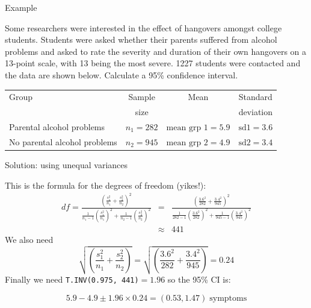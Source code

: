 \documentclass[12pt,xcolor=dvipsnames,handout,mathserif,aspectratio=169]{beamer}
\begin{document}
\begin{frame}{Example}

\begin{block}{}
Some researchers were interested in the effect of hangovers amongst college students. Students were asked whether their parents suffered from alcohol problems and asked to rate the severity and duration of their own hangovers on a 13-point scale, with 13 being the most severe. 1227 students were contacted and the data are shown below. Calculate a 95\% confidence interval.
\begin{center}
\begin{tabular}{lccc}
\hline
Group & Sample & Mean & Standard \\
& size & & deviation \\
\hline
Parental alcohol problems & $n_1=282$ & $\mbox{mean grp 1}=5.9$ & $\mbox{sd1}=3.6$\\ 
No parental alcohol problems & $n_2=945$ & $\mbox{mean grp 2}=4.9$ & $\mbox{sd2}=3.4$\\
\hline
\end{tabular}
\end{center}
\end{block}
\end{frame}

\begin{frame}{Solution: using unequal variances}

This is the formula for the degrees of freedom (yikes!):
\begin{eqnarray*}
df = \frac{ \left( \frac{s_1^2}{n_1} + \frac{s_2^2}{n_2} \right)^2 }{ \frac{1}{n_1-1} \left( \frac{s_1^2}{n_1} \right)^2 + \frac{1}{n_2-1} \left( \frac{s_2^2}{n_2} \right)^2 } &=& \frac{ \left( \frac{3.6^2}{282} + \frac{3.4^2}{945} \right)^2 }{ \frac{1}{282-1} \left( \frac{3.6^2}{282} \right)^2 + \frac{1}{945-1} \left( \frac{3.4^2}{945} \right)^2 } \\
&\approx& 441 
\end{eqnarray*}
We also need 
$$\sqrt{ \left( \frac{s_1^2}{n_1}+\frac{s_2^2}{n_2} \right) } = \sqrt{ \left( \frac{3.6^2}{282}+\frac{3.4^2}{945} \right) } = 0.24$$
Finally we need \texttt{T.INV(0.975, 441)}$=1.96$ so the 95\% CI is:
\begin{block}{}
$$5.9-4.9 \pm 1.96 \times 0.24 = (0.53,1.47)\; \mbox{symptoms}$$
\end{block}
\end{frame}
\end{document}
